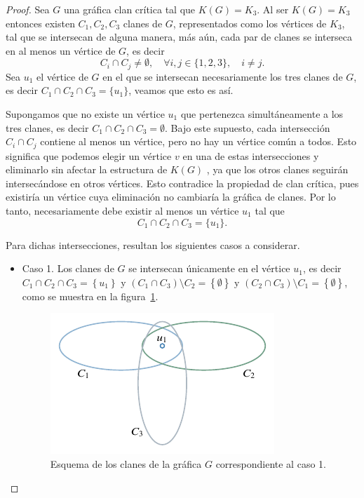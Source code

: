 \documentclass[12pt]{book}
\theoremstyle{definition}
\begin{document}
\begin{proof}
Sea $G$ una gráfica clan crítica tal que $K(G)=K_3$. Al ser $K(G)=K_3$ entonces existen $C_1,C_2,C_3$ clanes de $G$, representados como los vértices de $K_3$, tal que se intersecan de alguna manera, más aún, cada par de clanes se interseca en al menos un vértice de $G$, es decir
\begin{equation*}
C_i\cap C_j\neq \emptyset, \quad \forall i,j\in\{1,2,3\},\quad i\neq j.
\end{equation*}
Sea $u_1$ el vértice de $G$ en el que se intersecan necesariamente los tres clanes de $G$, es decir $C_1\cap C_2 \cap C_3=\{u_1\}$, veamos que esto es así.

Supongamos que no existe un vértice $u_1$ que pertenezca simultáneamente a los tres clanes, es decir  $C_1\cap C_2 \cap C_3=\emptyset$. Bajo este supuesto, cada intersección $C_i\cap C_j$ contiene al menos un vértice, pero no hay un vértice común a todos. Esto significa que podemos elegir un vértice $v$ en una de estas intersecciones y eliminarlo sin afectar la estructura de $K(G)$ , ya que los otros clanes seguirán intersecándose en otros vértices. Esto contradice la propiedad de clan crítica, pues existiría un vértice cuya eliminación no cambiaría la gráfica de clanes.
Por lo tanto, necesariamente debe existir al menos un vértice $u_1$ tal que
\begin{equation*}
C_1\cap C_2 \cap C_3=\{u_1\}.
\end{equation*}

Para dichas intersecciones, resultan los siguientes casos a considerar.
\begin{itemize}
\item Caso 1. 
Los clanes de $G$ se intersecan únicamente en el vértice $u_1$, es decir $C_1\cap C_2\cap C_3=\left\{u_1\right\}$ y $(C_1\cap C_3)\setminus C_2=\left\{\emptyset\right\}  \text{ y }(C_2\cap C_3)\setminus C_1=\left\{\emptyset\right\}$, como se muestra en la figura~\ref{F1}.

\begin{figure}[!htbp]
	\centering
	\includegraphics[scale=1.2]{Fig1.pdf}
	\caption{Esquema de los clanes de la gráfica $G$ correspondiente al caso 1.\label{F1}}
\end{figure}


\end{itemize}
\end{proof}
\end{document}
